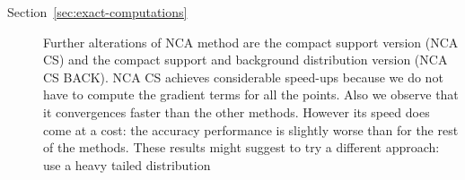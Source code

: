 \begin{description}
  \item[Section~\ref{sec:exact-computations}] Further alterations of NCA method are the compact support version (NCA CS) and the compact support and background distribution version (NCA CS BACK). NCA CS achieves considerable speed-ups because we do not have to compute the gradient terms for all the points. Also we observe that it convergences faster than the other methods. However its speed does come at a cost: the accuracy performance is slightly worse than for the rest of the methods. These results might suggest to try a different approach: use a heavy tailed distribution
\end{description}
 



